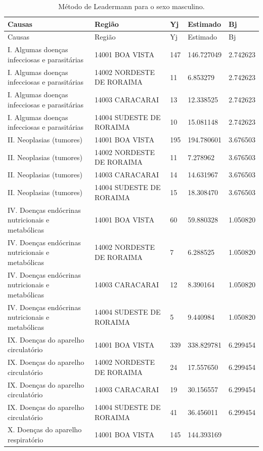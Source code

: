 \documentclass[
  12pt,
  a4paper,
]{scrreprt}
\begin{document}
\begin{longtable}[]{@{}lllll@{}}
\caption{Método de Leadermann para o sexo
masculino.}\label{T_a1030}\tabularnewline
\toprule\noalign{}
Causas & Região & Yj & Estimado & Bj \\
\midrule\noalign{}
\endfirsthead
\toprule\noalign{}
Causas & Região & Yj & Estimado & Bj \\
\midrule\noalign{}
\endhead
\bottomrule\noalign{}
\endlastfoot
I. Algumas doenças infecciosas e parasitárias & 14001 BOA VISTA & 147 &
146.727049 & 2.742623 \\
I. Algumas doenças infecciosas e parasitárias & 14002 NORDESTE DE
RORAIMA & 11 & 6.853279 & 2.742623 \\
I. Algumas doenças infecciosas e parasitárias & 14003 CARACARAI & 13 &
12.338525 & 2.742623 \\
I. Algumas doenças infecciosas e parasitárias & 14004 SUDESTE DE RORAIMA
& 10 & 15.081148 & 2.742623 \\
II. Neoplasias (tumores) & 14001 BOA VISTA & 195 & 194.780601 &
3.676503 \\
II. Neoplasias (tumores) & 14002 NORDESTE DE RORAIMA & 11 & 7.278962 &
3.676503 \\
II. Neoplasias (tumores) & 14003 CARACARAI & 14 & 14.631967 &
3.676503 \\
II. Neoplasias (tumores) & 14004 SUDESTE DE RORAIMA & 15 & 18.308470 &
3.676503 \\
IV. Doenças endócrinas nutricionais e metabólicas & 14001 BOA VISTA & 60
& 59.880328 & 1.050820 \\
IV. Doenças endócrinas nutricionais e metabólicas & 14002 NORDESTE DE
RORAIMA & 7 & 6.288525 & 1.050820 \\
IV. Doenças endócrinas nutricionais e metabólicas & 14003 CARACARAI & 12
& 8.390164 & 1.050820 \\
IV. Doenças endócrinas nutricionais e metabólicas & 14004 SUDESTE DE
RORAIMA & 5 & 9.440984 & 1.050820 \\
IX. Doenças do aparelho circulatório & 14001 BOA VISTA & 339 &
338.829781 & 6.299454 \\
IX. Doenças do aparelho circulatório & 14002 NORDESTE DE RORAIMA & 24 &
17.557650 & 6.299454 \\
IX. Doenças do aparelho circulatório & 14003 CARACARAI & 19 & 30.156557
& 6.299454 \\
IX. Doenças do aparelho circulatório & 14004 SUDESTE DE RORAIMA & 41 &
36.456011 & 6.299454 \\
X. Doenças do aparelho respiratório & 14001 BOA VISTA & 145 & 144.393169

\end{longtable}
\end{document}
